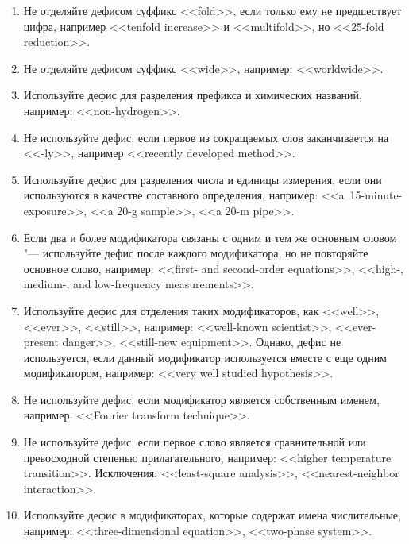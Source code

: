 \documentclass[a5paper, 10pt, twoside, numbers=enddot]{scrartcl}
\begin{document}
\begin{enumerate}
\begin{enumerate}
      \item Не отделяйте дефисом суффикс <<fold>>, если только ему не предшествует цифра, например
        <<tenfold increase>> и <<multifold>>, но <<25-fold reduction>>.

      \item Не отделяйте дефисом суффикс <<wide>>, например: <<worldwide>>.

      \item Используйте дефис для разделения префикса и химических названий, например:
        <<non-hydrogen>>.

      \item Не используйте дефис, если первое из сокращаемых слов заканчивается на <<-ly>>, например
        <<recently developed method>>.

      \item Используйте дефис для разделения числа и единицы измерения, если они используются в
        качестве составного определения, например: <<a~15-minute-exposure>>, <<a 20-g sample>>, <<a
        20-m pipe>>.

      \item Если два и более модификатора связаны с одним и тем же основным словом "--- используйте
        дефис после каждого модификатора, но не повторяйте основное слово, например: <<first- and
        second-order equations>>, <<high-, medium-, and low-frequency measurements>>.

      \item Используйте дефис для отделения таких модификаторов, как <<well>>, <<ever>>, <<still>>,
        например: <<well-known scientist>>, <<ever-present danger>>, <<still-new equipment>>. Однако,
        дефис не используется, если данный модификатор используется вместе с еще одним модификатором,
        например: <<very well studied hypothesis>>.

      \item Не используйте дефис, если модификатор является собственным именем, например: <<Fourier
        transform technique>>.

      \item Не используйте дефис, если первое слово является сравнительной или превосходной степенью
        прилагательного, например: <<higher tempera\-tu\-re transition>>. Исключения: <<least-square
        analysis>>, <<nearest-neighbor interaction>>.

      \item Используйте дефис в модификаторах, которые содержат имена числительные, например:
        <<three-dimensional equation>>, <<two-phase system>>.


\end{enumerate}
\end{enumerate}
\end{document}
